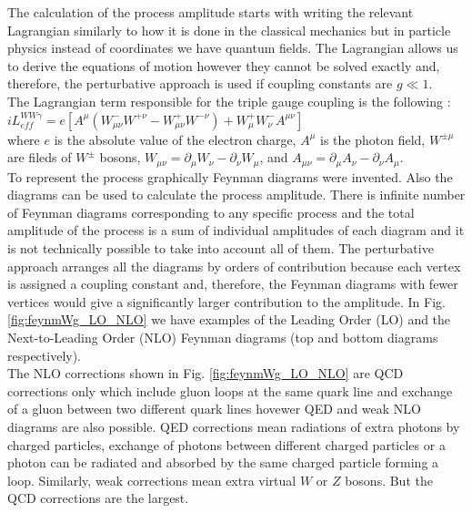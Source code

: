The calculation of the process amplitude starts with writing the relevant Lagrangian similarly to how it is done in the classical mechanics but in particle physics instead of coordinates we have quantum fields. The Lagrangian allows us to derive the equations of motion however they cannot be solved exactly and, therefore, the perturbative approach is used if coupling constants are $g \ll 1$.\\

The Lagrangian term responsible for the triple gauge coupling is the following \cite{ref_theory_aTGC}:\\

$i L_{eff}^{WW\gamma}= e [ A^\mu (W_{\mu\nu}^- W^{+\nu} - W_{\mu\nu}^+ W^{-\nu}) + W_{\mu}^+ W_{\nu}^- A^{\mu\nu} ] $\\

where $e$ is the absolute value of the electron charge, $A^\mu$ is the photon field, $W^{\pm\mu}$ are fileds of $W^\pm$ bosons, $W_{\mu\nu}=\partial_\mu W_\nu - \partial_\nu W_\mu$, and $A_{\mu\nu}=\partial_\mu A_\nu - \partial_\nu A_\mu$.\\

To represent the process graphically Feynman diagrams were invented. Also the diagrams can be used to calculate the process amplitude. There is infinite number of Feynman diagrams corresponding to any specific process and the total amplitude of the process is a sum of individual amplitudes of each diagram and it is not technically possible to take into account all of them. The perturbative approach arranges all the diagrams by orders of contribution because each vertex is assigned a coupling constant and, therefore, the Feynman diagrams with fewer vertices would give a significantly larger contribution to the amplitude. In Fig. \ref{fig:feynmWg_LO_NLO} we have examples of the Leading Order (LO) and the Next-to-Leading Order (NLO) Feynman diagrams (top and bottom diagrams respectively).\\

The NLO corrections shown in Fig. \ref{fig:feynmWg_LO_NLO} are QCD corrections only which include gluon loops at the same quark line and exchange of a gluon between two different quark lines hovewer QED and weak NLO diagrams are also possible. QED corrections mean radiations of extra photons by charged particles, exchange of photons between different charged particles or a photon can be radiated and absorbed by the same charged particle forming a loop. Similarly, weak corrections mean extra virtual $W$ or $Z$ bosons. But the QCD corrections are the largest.\\

